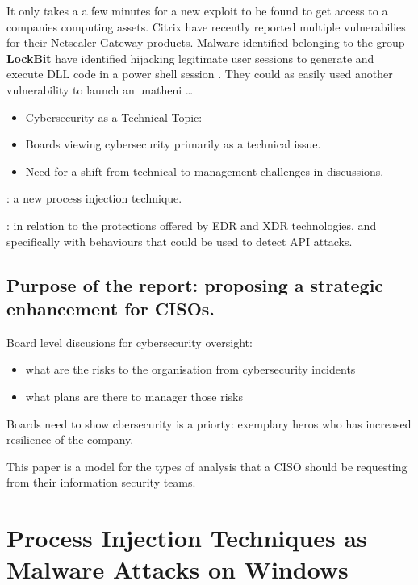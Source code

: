 \documentclass{article}
\newcommand{\outlinecite}[1]{\citetitle{#1} \textcite{#1}}
\begin{document}
It only takes a a few minutes for a new exploit to be found to get access to a companies computing assets.  Citrix have recently reported multiple
vulnerabilies for their Netscaler Gateway products.  Malware identified belonging to the group \textbf{LockBit} have identified hijacking legitimate user sessions to generate and execute DLL code in a power shell session \autocite{CISA:2023a}.  They could as easily used another vulnerability to launch an unatheni \ldots

     \begin{itemize}
\item Cybersecurity as a Technical Topic:
        \item Boards viewing cybersecurity primarily as a technical issue.
        \item Need for a shift from technical to management challenges in discussions.
     \end{itemize}
 

\outlinecite{Peixoto:2023}: a new process injection technique.

\outlinecite{Wang:2022}: in relation to the protections offered by EDR and XDR technologies, and specifically with behaviours that could be used to detect API attacks.

\subsection{Purpose of the report: proposing a strategic enhancement for CISOs.}

Board level discusions for cybersecurity oversight:
\begin{itemize}
\item what are the risks to the organisation from cybersecurity incidents
\item what plans are there to manager those risks
\end{itemize}

Boards need to show cbersecurity is a priorty: exemplary heros who has increased resilience of the company.

This paper is a model for the types of analysis that a CISO should be requesting from their information security teams.


\pagebreak
\section{Process Injection Techniques as Malware Attacks on Windows}
\end{document}
